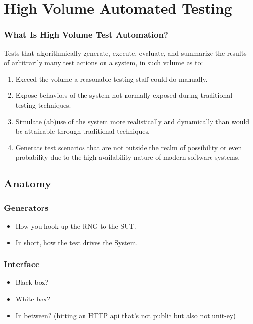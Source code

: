 \section{High Volume Automated Testing}

\begin{frame}
  \frametitle{What Is High Volume Test Automation?}
  Tests that algorithmically generate, execute, evaluate, and summarize the results of arbitrarily many test actions on a system, in such volume as to:
  \begin{enumerate}
  \item Exceed the volume a reasonable testing staff could do manually.
  \item Expose behaviors of the system not normally exposed during traditional testing techniques.
  \item Simulate (ab)use of the system more realistically and dynamically than would be attainable through traditional techniques.
  \item Generate test scenarios that are not outside the realm of possibility or even probability due to the high-availability nature of modern software systems.
\end{enumerate}\nocite{KanerHivatOverview}
\end{frame}

\subsection{Anatomy}

\begin{frame}
  \frametitle{Generators}
  \begin{itemize}
    \item How you hook up the RNG to the SUT.
    \item In short, how the test drives the System.
  \end{itemize}
\end{frame}

\begin{frame}
  \frametitle{Interface}
  \begin{itemize}
    \item Black box?
    \item White box?
    \item In between? (hitting an HTTP api that's not public but also not unit-ey)
  \end{itemize}
\end{frame}

